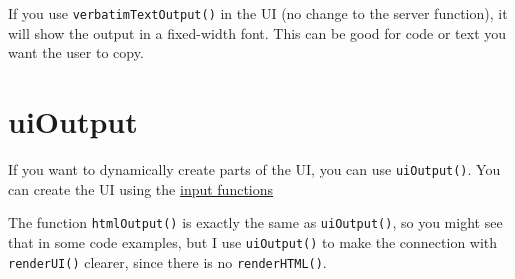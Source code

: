 \documentclass[
]{book}
\newenvironment{Shaded}{\begin{snugshade}}{\end{snugshade}}
\newcommand{\CommentTok}[1]{\textcolor[rgb]{0.56,0.35,0.01}{\textit{#1}}}
\newcommand{\DecValTok}[1]{\textcolor[rgb]{0.00,0.00,0.81}{#1}}
\newcommand{\FunctionTok}[1]{\textcolor[rgb]{0.00,0.00,0.00}{#1}}
\newcommand{\NormalTok}[1]{#1}
\newcommand{\OtherTok}[1]{\textcolor[rgb]{0.56,0.35,0.01}{#1}}
\newcommand{\SpecialCharTok}[1]{\textcolor[rgb]{0.00,0.00,0.00}{#1}}
\newcommand{\StringTok}[1]{\textcolor[rgb]{0.31,0.60,0.02}{#1}}
\begin{document}
If you use \texttt{verbatimTextOutput()} in the UI (no change to the server function), it will show the output in a fixed-width font. This can be good for code or text you want the user to copy.

\begin{Shaded}
\end{Shaded}

\hypertarget{uioutput}{%
\section{uiOutput}\label{uioutput}}

If you want to dynamically create parts of the UI, you can use \texttt{uiOutput()}. You can create the UI using the \protect\hyperlink{input_functions}{input functions}

\begin{Shaded}
\end{Shaded}

The function \texttt{htmlOutput()} is exactly the same as \texttt{uiOutput()}, so you might see that in some code examples, but I use \texttt{uiOutput()} to make the connection with \texttt{renderUI()} clearer, since there is no \texttt{renderHTML()}.
\end{document}
